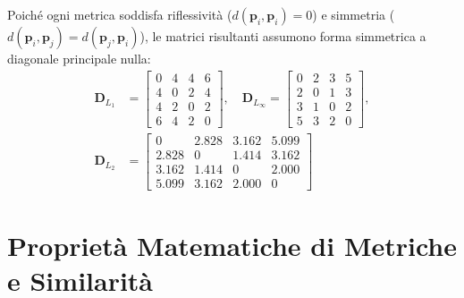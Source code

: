 Poiché ogni metrica soddisfa riflessività ($d(\mathbf{p}_i, \mathbf{p}_i) = 0$) e simmetria ($d(\mathbf{p}_i, \mathbf{p}_j) = d(\mathbf{p}_j, \mathbf{p}_i)$), le matrici risultanti assumono forma simmetrica a diagonale principale nulla:
\begin{align}
\mathbf{D}_{L_1} &= \begin{bmatrix}
0 & 4 & 4 & 6 \\
4 & 0 & 2 & 4 \\
4 & 2 & 0 & 2 \\
6 & 4 & 2 & 0
\end{bmatrix}, \quad
\mathbf{D}_{L_\infty} = \begin{bmatrix}
0 & 2 & 3 & 5 \\
2 & 0 & 1 & 3 \\
3 & 1 & 0 & 2 \\
5 & 3 & 2 & 0
\end{bmatrix}, \\[6pt]
\mathbf{D}_{L_2} &= \begin{bmatrix}
0 & 2.828 & 3.162 & 5.099 \\
2.828 & 0 & 1.414 & 3.162 \\
3.162 & 1.414 & 0 & 2.000 \\
5.099 & 3.162 & 2.000 & 0
\end{bmatrix}
\end{align}

\FloatBarrier
\section{Proprietà Matematiche di Metriche e Similarità}
\label{sec:dm-metric-axioms}

